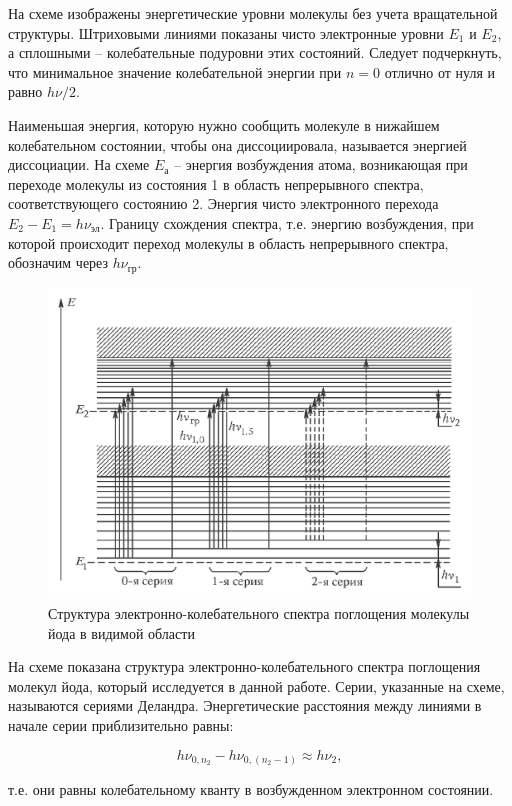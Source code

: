 \documentclass[a4paper, 12pt]{article}%
\begin{document}
	На схеме изображены энергетические уровни молекулы без учета вращательной структуры.  Штриховыми линиями показаны чисто электронные уровни $E_1$ и $E_2$,  а сплошными --  колебательные подуровни этих состояний.  Следует подчеркнуть,  что минимальное значение колебательной энергии при $n = 0$ отлично от нуля и равно $h \nu / 2$.

	Наименьшая энергия,  которую нужно сообщить молекуле в нижайшем колебательном состоянии,  чтобы она диссоциировала,  называется энергией диссоциации.  На схеме $E_{\text{а}}$ -- энергия возбуждения атома,  возникающая при переходе молекулы из состояния 1 в область непрерывного спектра,  соответствующего состоянию 2.  Энергия чисто электронного перехода $E_2 - E_1 = h\nu_{\text{эл}}$.  Границу схождения спектра,  т.е.  энергию возбуждения,  при которой происходит переход молекулы в область непрерывного спектра,  обозначим через $h \nu_{\text{гр}}$. 

	\begin{figure}[h!]
		\centering
		\includegraphics[scale=0.35]{Схема_3.PNG}
		\caption{Структура электронно-колебательного спектра поглощения молекулы йода в видимой области}
	\end{figure}

	На схеме показана структура электронно-колебательного спектра поглощения молекул йода,  который исследуется в данной работе.  Серии,  указанные на схеме,  называются сериями Деландра.  Энергетические расстояния между линиями в начале серии приблизительно равны:

\[h \nu_{0, n_2} - h \nu_{0, (n_2 - 1)} \approx h \nu_2,\]

т.е.  они равны колебательному кванту в возбужденном электронном состоянии.
\end{document}
